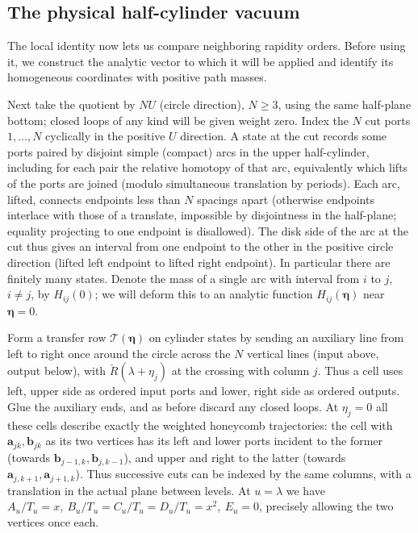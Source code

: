 \subsection{The physical half-cylinder vacuum}

The local identity now lets us compare neighboring rapidity orders.  Before
using it, we construct the analytic vector to which it will be applied
and identify its homogeneous coordinates with positive path masses.

Next take the quotient by \(N U\) (circle direction), \(N\ge3\), using the same half-plane bottom; closed loops of any kind will be given weight zero. Index the \(N\) cut ports \(1,\ldots,N\) cyclically in the positive \(U\) direction. A state at the cut records some ports paired by disjoint simple (compact) arcs in the upper half-cylinder, including for each pair the relative homotopy of that arc, equivalently which lifts of the ports are joined (modulo simultaneous translation by periods). Each arc, lifted, connects endpoints less than \(N\) spacings apart (otherwise endpoints interlace with those of a translate, impossible by disjointness in the half-plane; equality projecting to one endpoint is disallowed). The disk side of the arc at the cut thus gives an interval from one endpoint to the other in the positive circle direction (lifted left endpoint to lifted right endpoint). In particular there are finitely many states. Denote the mass of a single arc with interval from \(i\) to \(j\), \(i\ne j\), by \(H_{ij}(0)\); we will deform this to an analytic function \(H_{ij}(\boldsymbol\eta)\) near \(\boldsymbol\eta=0\).

Form a transfer row \(\mathcal T(\boldsymbol\eta)\) on cylinder states by sending an auxiliary line from left to right once around the circle across the \(N\) vertical lines (input above, output below), with \(\check R(\lambda+\eta_j)\) at the crossing with column \(j\). Thus a cell uses left, upper side as ordered input ports and lower, right side as ordered outputs. Glue the auxiliary ends, and as before discard any closed loops. At \(\eta_j=0\) all these cells describe exactly the weighted honeycomb trajectories: the cell with \(\mathbf a_{jk},\mathbf b_{jk}\) as its two vertices has its left and lower ports incident to the former (towards \(\mathbf b_{j-1,k},\mathbf b_{j,k-1}\)), and upper and right to the latter (towards \(\mathbf a_{j,k+1},\mathbf a_{j+1,k}\)). Thus successive cuts can be indexed by the same columns, with a translation in the actual plane between levels. At \(u=\lambda\) we have \(A_u/T_u=x,\ B_u/T_u=C_u/T_u=D_u/T_u=x^2,\ E_u=0\), precisely allowing the two vertices once each.

